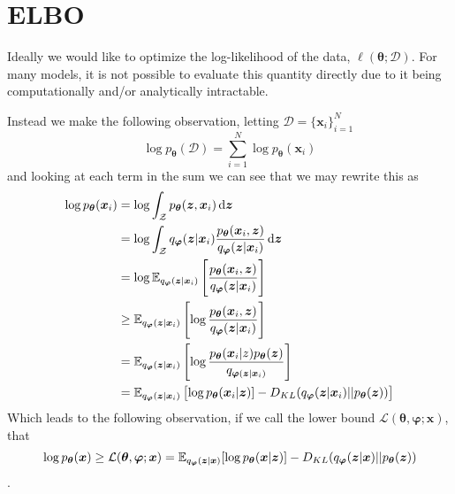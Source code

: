 \section{ELBO}

Ideally we would like to optimize the log-likelihood of the data,
$\ell(\bm{\theta} ; \mathcal{D})$. For many models, it is not possible to
evaluate this quantity directly due to it being computationally and/or
analytically intractable.

Instead we make the following observation, letting $\mathcal{D} = \{\bm{x}_i\}_{i=1}^N$
\begin{equation}
  \label{eq:log_likelihood_sum}
  \log p_{\bm{\theta}}(\mathcal{D}) = \sum_{i=1}^N \log p_{\bm{\theta}}(\bm{x}_i)
\end{equation}
and looking at each term in the sum we can see that we may rewrite this as
\begin{align*}
  \log p_{\bm{\theta}}(\bm{x}_i) & = \log \int_{\mathcal{Z}} p_{\bm{\theta}}(\bm{z}, \bm{x}_i) \dif \bm{z}\\
                               & = \log \int_{\mathcal{Z}}q_{\bm{\varphi}}(\bm{z} | \bm{x}_i)  \frac{p_{\bm{\theta}}(\bm{x}_i, \bm{z})}{q_{\bm{\varphi}}(\bm{z} | \bm{x}_i)} \dif \bm{z} \\
                               & = \log \E_{q_{\bm{\varphi}}(\bm{z} | \bm{x}_i)}\left[\frac{p_{\bm{\theta}}(\bm{x}_i, \bm{z})}{q_{\bm{\varphi}}(\bm{z} | \bm{x}_i)}\right] \\
                               & \geq \E_{q_{\bm{\varphi}}(\bm{z} | \bm{x}_i)}\left[\log \frac{p_{\bm{\theta}}(\bm{x}_i, \bm{z})}{q_{\bm{\varphi}}(\bm{z} | \bm{x}_i)}\right] \\
                               & = \E_{q_{\bm{\varphi}}(\bm{z} | \bm{x}_i)}\left[\log \frac{p_{\bm{\theta}}(\bm{x}_i | z) p_{\bm{\theta}}(\bm{z})}{q_{\bm{\varphi}(\bm{z} | \bm{x}_i)}}\right] \\
                               & = \E_{q_{\bm{\varphi}}(\bm{z} | \bm{x}_i)}\left[\log p_{\bm{\theta}}(\bm{x}_i | \bm{z})] - \KL{q_{\bm{\varphi}}(\bm{z} | \bm{x}_i)}{p_{\bm{\theta}}(\bm{z})}\right]
\end{align*}
Which leads to the following observation, if we call the lower bound
$\mathcal{L}(\bm{\theta}, \bm{\varphi}; \bm{x})$, that
\begin{equation}
  \label{eq:ELBO_inequality}
  \log p_{\bm{\theta}}(\bm{x}) \geq \mathcal{L}(\bm{\theta}, \bm{\varphi}; \bm{x}) = \operatorname{\mathbb{E}}_{q_{\bm{\varphi}}(\bm{z} | \bm{x})}[\log p_{\bm{\theta}}(\bm{x} | \bm{z})] - D_{KL}(q_{\bm{\varphi}}(\bm{z} | \bm{x}) || p_{\bm{\theta}}(\bm{z}))
\end{equation}.

